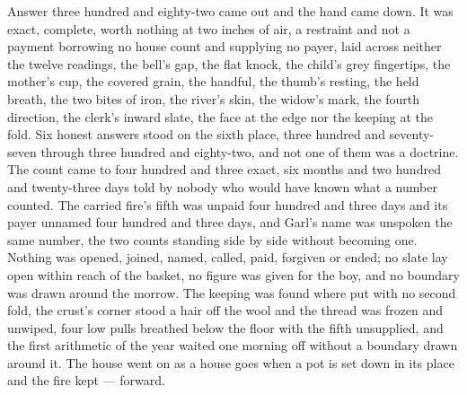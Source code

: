 Answer three hundred and eighty-two came out and the hand came down. It was exact, complete, worth nothing at two inches of air, a restraint and not a payment borrowing no house count and supplying no payer, laid across neither the twelve readings, the bell's gap, the flat knock, the child's grey fingertips, the mother's cup, the covered grain, the handful, the thumb's resting, the held breath, the two bites of iron, the river's skin, the widow's mark, the fourth direction, the clerk's inward slate, the face at the edge nor the keeping at the fold. Six honest answers stood on the sixth place, three hundred and seventy-seven through three hundred and eighty-two, and not one of them was a doctrine. The count came to four hundred and three exact, six months and two hundred and twenty-three days told by nobody who would have known what a number counted. The carried fire's fifth was unpaid four hundred and three days and its payer unnamed four hundred and three days, and Garl's name was unspoken the same number, the two counts standing side by side without becoming one. Nothing was opened, joined, named, called, paid, forgiven or ended; no slate lay open within reach of the basket, no figure was given for the boy, and no boundary was drawn around the morrow. The keeping was found where put with no second fold, the crust's corner stood a hair off the wool and the thread was frozen and unwiped, four low pulls breathed below the floor with the fifth unsupplied, and the first arithmetic of the year waited one morning off without a boundary drawn around it. The house went on as a house goes when a pot is set down in its place and the fire kept --- forward.
